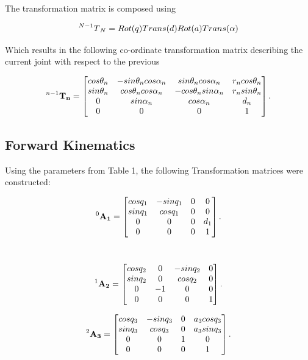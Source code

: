 \documentclass{UoNMCHA}
\numberwithin{equation}{section}
\begin{document}
The transformation matrix is composed using

\begin{equation}[h]
	\prescript{N-1}{}T_{N} = Rot(q) Trans(d) Rot(a) Trans(\alpha)
\end{equation} 

Which results in the following co-ordinate transformation matrix describing the current joint with respect to the previous\

\begin{equation*}
\mathbf{\prescript{n-1}{}T_{n}} =
\begin{bmatrix}
cos\theta_n & -sin\theta_ncos\alpha_n & sin\theta_ncos\alpha_n  & r_n cos\theta_n \\
sin\theta_n & cos\theta_ncos\alpha_n  & -cos\theta_nsin\alpha_n & r_n sin\theta_n \\
0           & sin\alpha_n	 		  & cos\alpha_n				& d_n\\
0 			& 0						  & 0						& 1
\end{bmatrix}.
\end{equation*}

\subsection{Forward Kinematics}
Using the parameters from Table 1, the following Transformation matrices were constructed:

\begin{equation*}
\mathbf{\prescript{0}{}A_{1}} =
\begin{bmatrix}
cosq_1 & -sinq_1 & 0  & 0 \\
sinq_1 & cosq_1  & 0  & 0 \\
0      & 0       & 0  & d_1\\
0 	   & 0	     & 0  & 1
\end{bmatrix}.
\end{equation*} \

\begin{equation*}
\mathbf{\prescript{1}{}A_{2}} =
\begin{bmatrix}
cosq_2 & 0 & -sinq_2  & 0 \\
sinq_2 & 0  & cosq_2  & 0 \\
0      & -1  & 0  & 0\\
0 	   & 0	 & 0  & 1
\end{bmatrix}.
\end{equation*}

\begin{equation*}
\mathbf{\prescript{2}{}A_{3}} =
\begin{bmatrix}
cosq_3 & -sinq_3 & 0  & a_3 cosq_3 \\
sinq_3 & cosq_3  & 0  & a_3 sinq_3 \\
0      & 0  & 1  & 0\\
0 	   & 0	 & 0  & 1
\end{bmatrix}.
\end{equation*}
\end{document}
